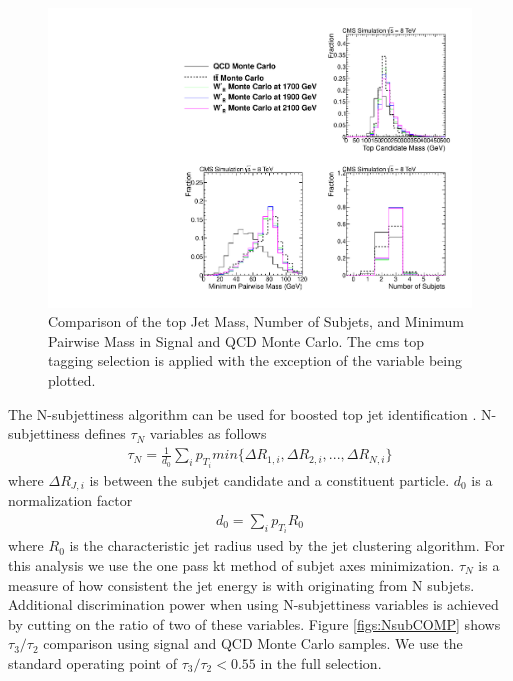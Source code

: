 \begin{figure}[htb]
\centering
\includegraphics[width=1.0\textwidth]{AN-13-004/figs/CutCompqcdandsignal}
\caption{Comparison of the top Jet Mass, Number of Subjets, and Minimum Pairwise Mass in Signal and QCD Monte Carlo.  The cms top tagging selection is applied 
with the exception of the variable being plotted.}
\label{figs:CutCompP}
\end{figure}

The N-subjettiness algorithm can be used for boosted top jet identification \cite{Thaler:2011gf}.  N-subjettiness defines $\tau_N$ variables as follows 
\begin{eqnarray}
	\tau_{N} = \frac{1}{d_0}\sum_{i}p_{T_i}min\{\Delta R_{1,i},\Delta R_{2,i},...,\Delta R_{N,i}\}
\end{eqnarray}
where $\Delta R_{J,i}$ is between the subjet candidate and a constituent particle.  $d_0$ is a normalization factor 
\begin{eqnarray}
	d_0 = \sum_i p_{T_i} R_0
\end{eqnarray}
where $R_0$ is the characteristic jet radius used by the jet clustering algorithm.  For this analysis we use the one pass kt method of subjet axes minimization.  $\tau_N$ is a measure of how consistent the jet energy is with originating from N subjets. 
Additional discrimination power when using N-subjettiness variables is achieved by cutting on the ratio of two of these variables.   
Figure \ref{figs:NsubCOMP} shows $\tau_3/\tau_2$ comparison using signal and QCD Monte Carlo samples.  We use the standard operating point of $\tau_3/\tau_2 < 0.55$  \cite{JME13007} in the full selection.

